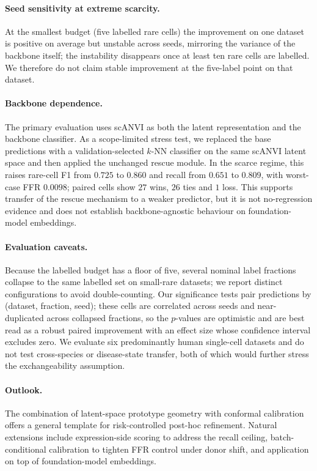 \paragraph{Seed sensitivity at extreme scarcity.} At the smallest budget (five labelled rare cells) the improvement
on one dataset is positive on average but unstable across seeds, mirroring the variance of the backbone itself; the
instability disappears once at least ten rare cells are labelled. We therefore do not claim stable improvement at the
five-label point on that dataset.

\paragraph{Backbone dependence.} The primary evaluation uses scANVI as both the latent representation and the
backbone classifier. As a scope-limited stress test, we replaced the base predictions with a validation-selected
$k$-NN classifier on the same scANVI latent space and then applied the unchanged rescue module. In the scarce regime,
this raises rare-cell F1 from $0.725$ to $0.860$ and recall from $0.651$ to $0.809$, with worst-case FFR $0.0098$;
paired cells show $27$ wins, $26$ ties and $1$ loss. This supports transfer of the rescue mechanism to a weaker
predictor, but it is not no-regression evidence and does not establish backbone-agnostic behaviour on foundation-model
embeddings.

\paragraph{Evaluation caveats.} Because the labelled budget has a floor of five, several nominal label fractions
collapse to the same labelled set on small-rare datasets; we report distinct configurations to avoid double-counting.
Our significance tests pair predictions by (dataset, fraction, seed); these cells are correlated across seeds and
near-duplicated across collapsed fractions, so the $p$-values are optimistic and are best read as a robust paired
improvement with an effect size whose confidence interval excludes zero. We evaluate six predominantly human
single-cell datasets and do not test cross-species or disease-state transfer, both of which would further stress the
exchangeability assumption.

\paragraph{Outlook.} The combination of latent-space prototype geometry with conformal calibration offers a general
template for risk-controlled post-hoc refinement. Natural extensions include expression-side scoring to address the
recall ceiling, batch-conditional calibration to tighten FFR control under donor shift, and application on top of
foundation-model embeddings.

